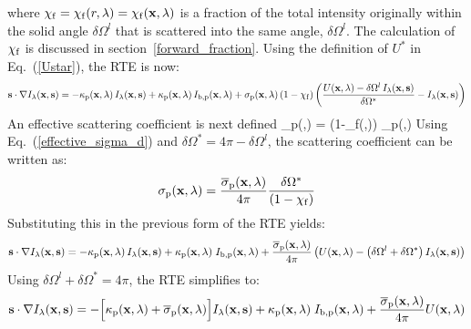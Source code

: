 where $\chi_{\rm f} = \chi_{\rm f}(r,\lambda)=\chi_{\rm f}({\mathbf{x}},\lambda)$ is a fraction of the total intensity originally within the solid angle $\delta\Omega^l$ that is scattered
into the same angle, $\delta\Omega^l$. The calculation of $\chi_{\rm f}$ is discussed in section~\ref{forward_fraction}. Using the definition of $U^*$ in Eq.~(\ref{Ustar}), the RTE is now:
\begin{equation}
\mathbf{s} \cdot \nabla I_{\lambda}(\mathbf{x},\mathbf{s}) = -\kappa_{\rm p}(\mathbf{x},\lambda) \,
I_{\lambda}(\mathbf{x},\mathbf{s}) + \kappa_{\rm p}(\mathbf{x},\lambda) \, I_{{\rm b,p}}(\mathbf{x},\lambda) +
\sigma_{\rm p}(\mathbf{x},\lambda) \left( 1-\chi_{\rm f} \right) \left( \frac{U(\mathbf{x},\lambda) - \delta\Omega^l \, I_{\lambda}(\mathbf{x},\mathbf{s})}{\delta\Omega^*} - I_{\lambda}(\mathbf{x},\mathbf{s}) \right)
\end{equation}
An effective scattering coefficient is next defined
\be
\label{effective_sigma_d}
\overline{\sigma}_{\rm p}(\bx,\la) =  \Big(1-\chi_{\rm f}(\bx,\la)\Big) \; \sigma_{\rm p}(\bx,\la)
\ee
Using Eq.~(\ref{effective_sigma_d}) and $\delta\Omega^*=4\pi - \delta\Omega^l$, the scattering coefficient can be written as:
\begin{equation}
\sigma_{\rm p}(\mathbf{x},\lambda) = \frac{\overline{\sigma}_{\rm p}(\mathbf{x},\lambda)}{4\pi} \frac{\delta\Omega^*}{\left(1-\chi_{\rm f} \right)}
\end{equation}
Substituting this in the previous form of the RTE yields:
\begin{equation}
\mathbf{s} \cdot \nabla I_{\lambda}(\mathbf{x},\mathbf{s}) = -\kappa_{\rm p}(\mathbf{x},\lambda) \,
I_{\lambda}(\mathbf{x},\mathbf{s}) +\kappa_{\rm p}(\mathbf{x},\lambda) \; I_{{\rm b,p}}(\mathbf{x},\lambda) +
\frac{\overline{\sigma}_{\rm p}(\mathbf{x},\lambda)}{4\pi} \left( U(\mathbf{x},\lambda) - \left( \delta \Omega^l
+ \delta\Omega^* \right) I_{\lambda}(\mathbf{x},\mathbf{s}) \right)
\end{equation}
Using $\delta\Omega^l+ \delta\Omega^*=4\pi $, the RTE simplifies to:
\begin{equation}
\mathbf{s} \cdot \nabla I_{\lambda}(\mathbf{x},\mathbf{s}) = -\Big[\kappa_{\rm p}(\mathbf{x},\lambda) + \overline{\sigma}_{\rm p}(\mathbf{x},\lambda)\Big]
I_{\lambda}(\mathbf{x},\mathbf{s}) +\kappa_{\rm p}(\mathbf{x},\lambda) \; I_{{\rm b,p}}(\mathbf{x},\lambda) +
\frac{\overline{\sigma}_{\rm p}(\mathbf{x},\lambda)}{4\pi} U(\mathbf{x},\lambda)
\end{equation}




